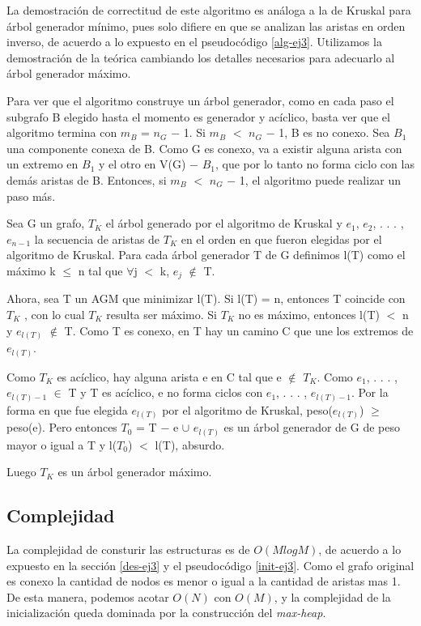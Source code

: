 La demostración de correctitud de este algoritmo es análoga a la de Kruskal para árbol generador mínimo, pues solo difiere en que se analizan las aristas en orden inverso, de acuerdo a lo expuesto en el pseudocódigo \ref{alg-ej3}.
Utilizamos la demostración de la teórica cambiando los detalles necesarios para adecuarlo al árbol generador máximo.

Para ver que el algoritmo construye un árbol generador, como en cada paso el subgrafo B elegido hasta el momento es generador y acíclico, basta ver que el algoritmo termina
con $m_{B}$ = $n_{G}$ − 1. Si $m_{B}$ $<$ $n_{G}$ − 1, B es no conexo. Sea $B_{1}$ una componente conexa de B. Como G es conexo, va a existir alguna arista con un extremo en $B_{1}$ y el otro en V(G) − $B_{1}$, 
que por lo tanto no forma ciclo con las demás aristas de B. Entonces, si $m_{B}$ $<$ $n_{G}$ − 1, el algoritmo puede realizar un paso más.

Sea G un grafo, $T_{K}$ el árbol generado por el algoritmo de Kruskal y {$e_{1}$, $e_{2}$, . . . , $e_{n-1}$} la secuencia de aristas de $T_{K}$ en el orden en que fueron elegidas por el algoritmo 
de Kruskal. Para cada árbol generador T de G definimos l(T) como el máximo k $\leq$ n tal que $\forall$j $<$ k, $e_{j}$ $\not\in$ T.

Ahora, sea T un AGM que minimizar l(T). Si l(T) = n, entonces T coincide con $T_{K}$ , con lo cual $T_{K}$ resulta ser máximo. Si $T_{K}$ no es máximo, entonces l(T) $<$ n y $e_{l(T)}$ $\not\in$ T. 
Como T es conexo, en T hay un camino C que une los extremos de $e_{l(T)}$.

Como $T_{K}$ es acíclico, hay alguna arista e en C tal que e $\not\in$ $T_{K}$. Como $e_{1}$, . . . , $e_{l(T)−1}$ $\in$ T y T es acíclico, e no forma ciclos con $e_{1}$, . . . , $e_{l(T)−1}$. Por la forma en 
que fue elegida $e_{l(T)}$ por el algoritmo de Kruskal, peso($e_{l(T)}$) $\geq$ peso(e). Pero entonces $T_{0}$ = T − e $\cup$ {$e_{l(T)}$} es un árbol generador de G de peso mayor o igual a T y 
l($T_{0}$) $<$ l(T), absurdo.

Luego $T_{K}$ es un árbol generador máximo. 



\subsection{Complejidad}

La complejidad de consturir las estructuras es de $O(M log M)$, de acuerdo a lo expuesto en la sección \ref{des-ej3} y el pseudocódigo \ref{init-ej3}. Como el grafo original es conexo la cantidad de nodos es menor o igual a la cantidad de aristas mas 1. De esta manera, podemos acotar $O(N)$ con $O(M)$, y la complejidad de la inicialización queda dominada por la construcción del \textit{max-heap}.

